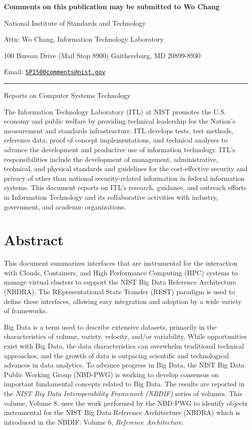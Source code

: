 \documentclass[9pt,]{article}
\begin{document}
\textbf{Comments on this publication may be submitted to Wo Chang}

National Institute of Standards and Technology

Attn: Wo Chang, Information Technology Laboratory

100 Bureau Drive (Mail Stop 8900) Gaithersburg, MD 20899-8930

Email:
\href{mailto:SP1500comments@nist.gov}{\nolinkurl{SP1500comments@nist.gov}}

\begin{center}\rule{0.5\linewidth}{\linethickness}\end{center}

Reports on Computer Systems Technology

The Information Technology Laboratory (ITL) at NIST promotes the U.S.
economy and public welfare by providing technical leadership for the
Nation's measurement and standards infrastructure. ITL develops tests,
test methods, reference data, proof of concept implementations, and
technical analyses to advance the development and productive use of
information technology. ITL's responsibilities include the development
of management, administrative, technical, and physical standards and
guidelines for the cost-effective security and privacy of other than
national security-related information in federal information systems.
This document reports on ITL's research, guidance, and outreach efforts
in Information Technology and its collaborative activities with
industry, government, and academic organizations.

\hypertarget{abstract}{%
\section{Abstract}\label{abstract}}

This document summarizes interfaces that are instrumental for the
interaction with Clouds, Containers, and High Performance Computing
(HPC) systems to manage virtual clusters to support the NIST Big Data
Reference Architecture (NBDRA). The REpresentational State Transfer
(REST) paradigm is used to define these interfaces, allowing easy
integration and adoption by a wide variety of frameworks.

Big Data is a term used to describe extensive datasets, primarily in the
characteristics of volume, variety, velocity, and/or variability. While
opportunities exist with Big Data, the data characteristics can
overwhelm traditional technical approaches, and the growth of data is
outpacing scientific and technological advances in data analytics. To
advance progress in Big Data, the NIST Big Data Public Working Group
(NBD-PWG) is working to develop consensus on important fundamental
concepts related to Big Data. The results are reported in the \emph{NIST
Big Data Interoperability Framework (NBDIF)} series of volumes. This
volume, Volume 8, uses the work performed by the NBD-PWG to identify
objects instrumental for the NIST Big Data Reference Architecture
(NBDRA) which is introduced in the NBDIF: Volume 6, \emph{Reference
Architecture}.
\end{document}

